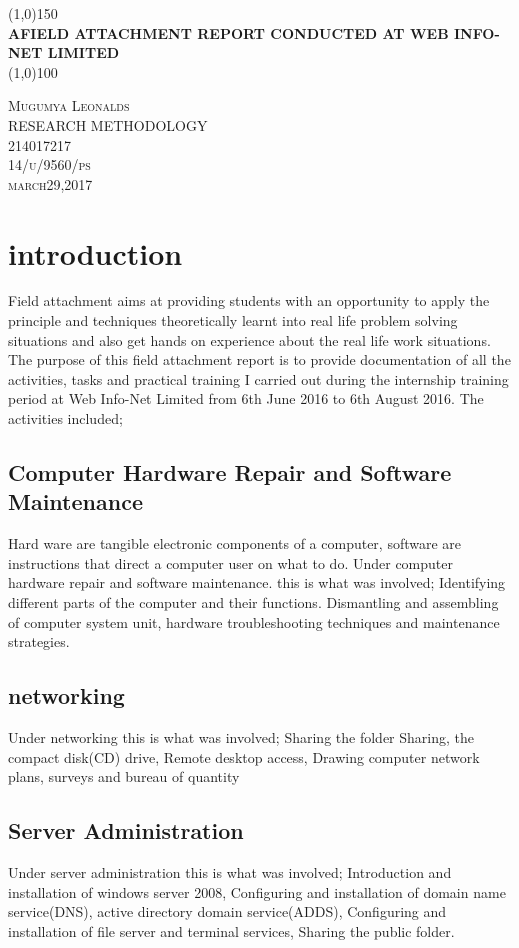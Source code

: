 \documentclass[12]{article}
\begin{document}
\begin{titlepage}
\begin{center}
\line(1,0){150}\\
\huge{\bfseries AFIELD ATTACHMENT REPORT CONDUCTED AT WEB INFO-NET LIMITED}\\
\line(1,0){100}\\
\end{center}
\begin{flushright}
\textsc{\LARGE Mugumya Leonalds\\
RESEARCH METHODOLOGY\\
214017217\\
14/u/9560/ps\\
march29,2017\\}
\end{flushright}
\end{titlepage}
\section{introduction}
Field attachment aims at providing students with an opportunity to apply the principle and techniques theoretically learnt into real life problem solving situations and also get hands on experience about the real life work situations. The purpose of this field attachment report is to provide documentation of all the activities, tasks and practical training I carried out during the internship training period at Web Info-Net Limited from 6th June 2016 to 6th August 2016. The activities included;
\subsection{Computer Hardware Repair and Software Maintenance }
Hard ware are tangible electronic components of a computer, software are instructions that direct a computer user on what to do. Under computer hardware repair and software maintenance. this is what was involved;
Identifying different parts of the computer and their functions. Dismantling and assembling of computer system unit, hardware troubleshooting techniques and maintenance strategies.
\subsection{networking}
Under networking this is what was involved; Sharing the folder Sharing, the compact disk(CD) drive, Remote desktop access, Drawing computer network plans, surveys and bureau of quantity
\subsection{Server Administration }
Under server administration this is what was involved; Introduction and installation of windows server 2008, Configuring and installation of domain name service(DNS), active directory domain service(ADDS), Configuring and installation of file server and terminal services, Sharing the public folder.
\end{document}
